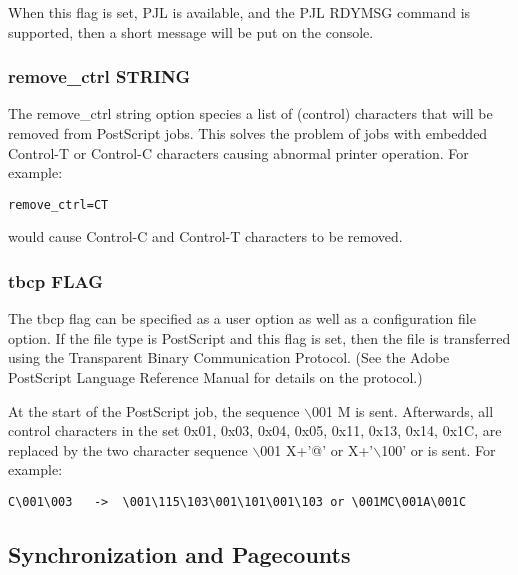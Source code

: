 \documentclass[a4paper]{article}
\begin{document}
When this flag is set,
PJL is available,
and the PJL
{\ttfamily RDYMSG}
command is supported,
then a short message will be put on the console.


\subsubsection{remove\_ctrl STRING
\label{remove_ctrl}}

The
{\ttfamily remove\_ctrl} string option species a list of (control) characters
that will be removed from PostScript jobs.
This solves the problem of jobs with embedded Control-T or Control-C
characters causing abnormal printer operation.
For example:
\begin{tscreen}
\begin{verbatim}
remove_ctrl=CT
\end{verbatim}
\end{tscreen}

would cause Control-C and Control-T characters to be removed.


\subsubsection{tbcp FLAG
\label{tbcp}}

The
{\ttfamily tbcp}
flag can be specified as a user option as well as a
configuration file option.
If the file type is PostScript and this flag is set,
then the file is transferred using the Transparent Binary Communication
Protocol.
(See the Adobe PostScript Language Reference Manual for details on
the protocol.)

At the start of the PostScript job,
the sequence {\ttfamily $\backslash$001} {\ttfamily M} is sent.
Afterwards,  all control characters in the set
{\ttfamily 0x01, 0x03, 0x04, 0x05,
0x11, 0x13, 0x14, 0x1C,}
are replaced by the two character sequence {\ttfamily $\backslash$001}
{\ttfamily X+'@'} or
{\ttfamily X+'$\backslash$100'} or
is sent.
For example:
\begin{tscreen}
\begin{verbatim}
C\001\003   ->  \001\115\103\001\101\001\103 or \001MC\001A\001C
\end{verbatim}
\end{tscreen}





\subsection{Synchronization and Pagecounts
\label{syncpage}
\label{pagecount}
\label{pagecount_interval}
\label{pagecount_timeout}
\label{pagecount_ps_code}
\label{sync}
\label{sync_interval}
\label{sync_timeout}}
\end{document}
